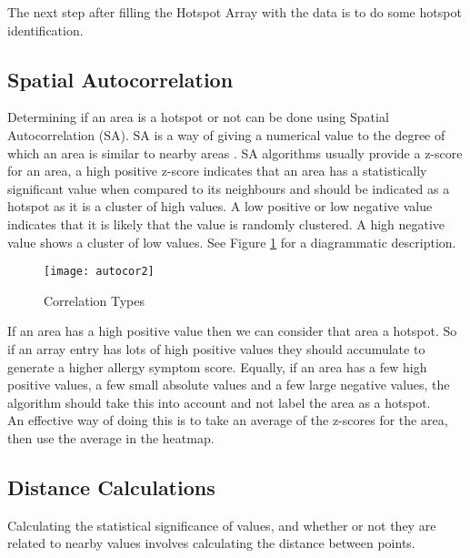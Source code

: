 The next step after filling the Hotspot Array with the data is to do some hotspot identification.

\subsection{Spatial Autocorrelation}

Determining if an area is a hotspot or not can be done using Spatial Autocorrelation (SA). SA is a way of giving a numerical value to the degree of which an area is similar to nearby areas \cite{autocor}. SA algorithms usually provide a z-score for an area, a high positive z-score indicates that an area has a statistically significant value when compared to its neighbours and should be indicated as a hotspot as it is a cluster of high values. A low positive or low negative value indicates that it is likely that the value is randomly clustered. A high negative value shows a cluster of low values. See Figure \ref{fig:autocor2} for a diagrammatic description.\\

\begin{figure}[H]
\begin{center}
\texttt{[image: autocor2]}
\caption{Correlation Types \cite{ytcorr}}
\label{fig:autocor2}
\end{center}
\end{figure}

If an area has a high positive value then we can consider that area a hotspot. So if an array entry has lots of high positive values they should accumulate to generate a higher allergy symptom score. Equally, if an area has a few high positive values, a few small absolute values and a few large negative values, the algorithm should take this into account and not label the area as a hotspot.\\

An effective way of doing this is to take an average of the z-scores for the area, then use the average in the heatmap.

\subsection{Distance Calculations}

Calculating the statistical significance of values, and whether or not they are related to nearby values involves calculating the distance between points.\\

